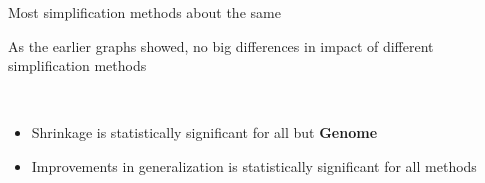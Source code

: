 \documentclass{beamer}
\begin{document}
\begin{frame}{Most simplification methods about the same}

As the earlier graphs showed, no big differences in impact of different simplification methods

~

\begin{itemize}
	\item Shrinkage is statistically significant for all but \textbf{Genome}
	\item Improvements in generalization is statistically significant for all methods
\end{itemize}


\end{frame}
\end{document}
